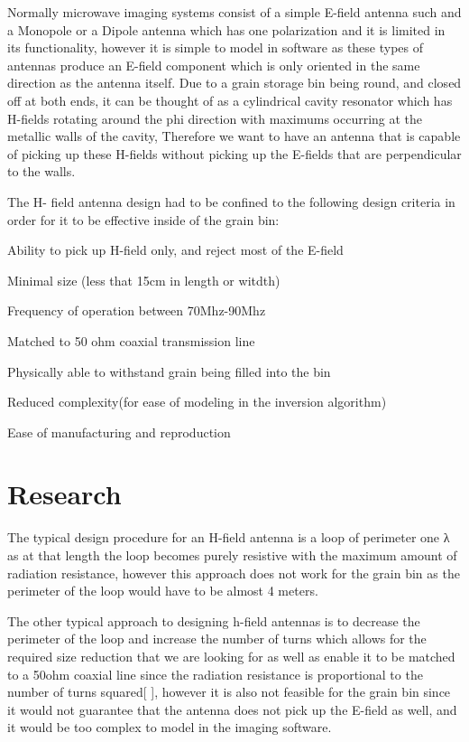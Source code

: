 Normally microwave imaging systems consist of a simple E-field antenna such and a Monopole or a Dipole antenna which has one polarization and it is limited in its functionality, however it is simple to model in software as these types of antennas produce an E-field component which is only oriented in the same direction as the antenna itself. Due to a grain storage bin being round, and closed off at both ends, it can be thought of as a cylindrical cavity resonator which has H-fields rotating around the phi direction with maximums occurring at the metallic walls of the cavity, Therefore we want to have an antenna that is capable of picking up these H-fields without picking up the E-fields that are perpendicular to the walls.

The H- field antenna design had to be confined to the following design criteria in order for it to be effective inside of the grain bin:

\begin{itemize*}

\item Ability to pick up H-field only, and reject most of the E-field
\item Minimal size (less that 15cm in length or witdth)
\item Frequency of operation between 70Mhz-90Mhz
\item Matched to 50 ohm coaxial transmission line
\item Physically able to withstand grain being filled into the bin
\item Reduced complexity(for ease of modeling in the inversion algorithm)
\item Ease of manufacturing and reproduction

\end{itemize*}

\section{Research}

The typical design procedure for an H-field antenna is a loop of perimeter one λ as at that length the loop becomes purely resistive with the maximum amount of radiation resistance, however this approach does not work for the grain bin as the perimeter of the loop would have to be almost 4 meters.

The other typical approach to designing h-field antennas is to decrease the perimeter of the loop and increase the number of turns which allows for the required size reduction that we are looking for as well as enable it to be matched to a 50ohm coaxial line since the radiation resistance is proportional to the number of turns squared[ ], however it is also not feasible for the grain bin since it would not guarantee that the antenna does not pick up the E-field as well, and it would be too complex to model in the imaging software.

